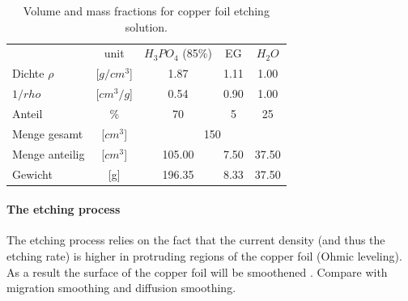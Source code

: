 \begin{table}
	\centering
	\caption{Volume and mass fractions for copper foil etching solution.}
	\begin{tabular}{lcccc}
		&unit	&$H_3PO_4$ (85\%)&	EG	&	$H_2O$	\\
		Dichte $\rho$   &[$g/cm^3$]	&	1.87	&	1.11	&	1.00	\\
		$1/rho$		&[$cm^3/g$]	&	0.54	&	0.90	&	1.00	\\
		Anteil 		& \%		&	70	&	5	&	25	\\ \hline
		Menge gesamt    &[$cm^3$]	&		\multicolumn{3}{c}{150} 	\\
		Menge anteilig  &[$cm^3$]	&	105.00	&	7.50	&	37.50	\\
		Gewicht         &[g]		&	196.35	&	8.33	&	37.50	\\
	\end{tabular}
	\label{tab:used-etching-solution}
\end{table}


%

\paragraph{The etching process}
The etching process relies on the fact that the current density (and thus the etching rate) is higher in protruding regions of the copper foil (Ohmic leveling).  As a result the surface of the copper foil will be smoothened \cite{luo_effect_2011}. Compare with migration smoothing and diffusion smoothing\cite{jinshan_electrochemical_2004}.